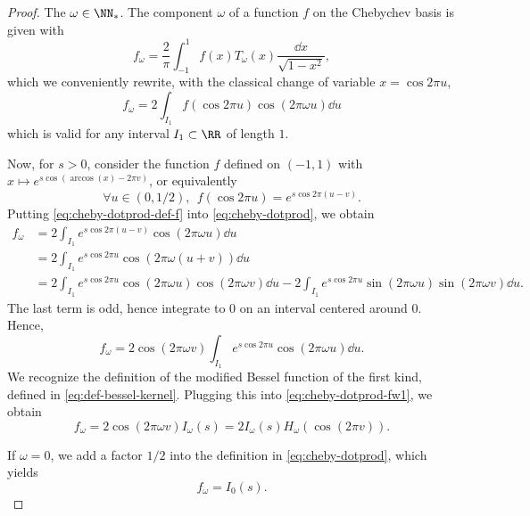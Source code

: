 \documentclass{article}
\begin{document}
\begin{proof}
  The $\omega \in \NN_*$. The component $\omega$ of a function $f$ on the Chebychev basis is given with
  \begin{equation*}
    f_\omega = \frac{2}{\pi} \int_{-1}^1 f(x) T_\omega(x) \frac{\dd x}{\sqrt{1 - x^2}},
  \end{equation*}
  which we conveniently rewrite, with the classical change of variable $x = \cos 2\pi u$,
  \begin{equation}\label{eq:cheby-dotprod}
    f_\omega = 2 \int_{I_1} f(\cos 2\pi u) \cos(2\pi \omega u) \dd u
  \end{equation}
  which is valid for any interval $I_1 \subset \RR$ of length $1$.

  Now, for $s > 0$, consider the function $f$ defined on $(-1, 1)$ with $x \mapsto e^{s \cos(\arccos(x) - 2\pi v)}$, or equivalently
  \begin{equation}\label{eq:cheby-dotprod-def-f}
    \forall u \in (0,1/2), ~~ f(\cos 2\pi u) = e^{s \cos 2\pi (u - v)}.
  \end{equation}
  Putting \cref{eq:cheby-dotprod-def-f} into \cref{eq:cheby-dotprod}, we obtain
  \begin{align*}
    f_\omega
     & = 2 \int_{I_1} e^{s \cos 2\pi (u - v)} \cos (2\pi \omega u) \dd u                                                                                                  \\
     & = 2 \int_{I_1} e^{s \cos 2\pi u} \cos (2\pi \omega (u + v)) \dd u                                                                                                  \\
     & = 2 \int_{I_1} e^{s \cos 2\pi u} \cos (2\pi \omega u) \cos (2\pi \omega v) \dd u - 2 \int_{I_1} e^{s \cos 2\pi u} \sin (2\pi \omega u) \sin (2\pi \omega v) \dd u.
  \end{align*}
  The last term is odd, hence integrate to $0$ on an interval centered around $0$. Hence,
  \begin{equation}\label{eq:cheby-dotprod-fw1}
    f_\omega = 2 \cos (2\pi \omega v) \int_{I_1} e^{s \cos 2\pi u} \cos (2\pi \omega u) \dd u.
  \end{equation}
  We recognize the definition of the modified Bessel function of the first kind, defined in \cref{eq:def-bessel-kernel}. Plugging this into \cref{eq:cheby-dotprod-fw1}, we obtain
  \begin{equation}
    f_\omega = 2 \cos(2\pi \omega v) I_\omega(s) = 2I_\omega(s) H_\omega(\cos(2\pi v)).
  \end{equation}

  If $\omega = 0$, we add a factor $1/2$ into the definition in \cref{eq:cheby-dotprod}, which yields
  \begin{equation}
    f_\omega = I_0(s).
  \end{equation}
\end{proof}
\end{document}
